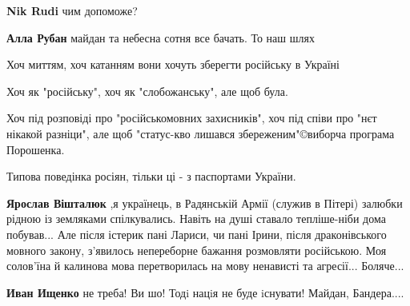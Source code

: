 \begin{itemize}
\begin{itemize}
\begin{itemize}
\textbf{Nik Rudi} чим допоможе?

 
\textbf{Алла Рубан} майдан та небесна сотня все бачать. То наш шлях
\end{itemize}

\end{itemize}

 

Хоч миттям, хоч катанням вони хочуть зберегти російську в Україні

Хоч як "російську", хоч як "слобожанську", але щоб була.

Хоч під розповіді про "російськомовних захисників", хоч під співи про "нєт
нікакой разніци", але щоб "статус-кво лишався збереженим"©виборча програма
Порошенка.

Типова поведінка росіян, тільки ці - з паспортами України.

\begin{itemize}
 
\textbf{Ярослав Вішталюк} ,я українець, в Радянській Армії (служив в Пітері)
залюбки рідною із земляками спілкувались. Навіть на душі ставало тепліше-ніби
дома побував... Але після істерик пані Лариси, чи пані Ірини, після
драконівського мовного закону, з'явилось непереборне бажання розмовляти
російською. Моя солов'їна й калинова мова перетворилась на мову ненависті та
агресії... Боляче...

\begin{itemize}

 
\textbf{Иван Ищенко} не треба! Ви шо! Тодi нацiя не буде iснувати! Майдан, Бандера....

 

\end{itemize}
\end{itemize}
\end{itemize}
